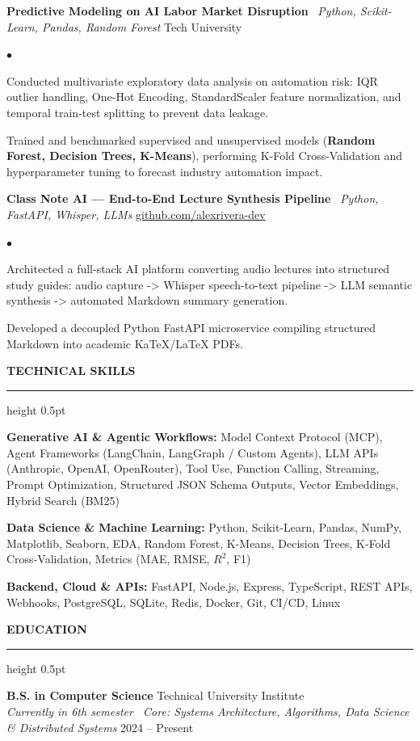\documentclass[10pt,letterpaper]{article}
\newcommand{\resumesection}[1]{%
  \vspace{2pt}%
  {\color{primary}\normalsize\bfseries\MakeUppercase{#1}}%
  \vspace{1pt}\hrule height 0.5pt\vspace{2pt}%
}
\renewenvironment{itemize}{%
  \begin{list}{\color{primary}$\bullet$}{%
    \setlength{\leftmargin}{1.1em}%
    \setlength{\itemsep}{0.5pt}%
    \setlength{\topsep}{1pt}%
    \setlength{\parsep}{0pt}%
    \setlength{\partopsep}{0pt}%
  }%
}{%
  \end{list}%
}
\newenvironment{skilllist}{%
  \begin{list}{}{%
    \setlength{\leftmargin}{0pt}%
    \setlength{\itemsep}{0.5pt}%
    \setlength{\topsep}{1pt}%
    \setlength{\parsep}{0pt}%
    \setlength{\partopsep}{0pt}%
  }%
}{%
  \end{list}%
}
\begin{document}
\vspace{1pt}

\textbf{Predictive Modeling on AI Labor Market Disruption} \textbar\ \textit{Python, Scikit-Learn, Pandas, Random Forest} \hfill Tech University
\begin{itemize}
    \item Conducted multivariate exploratory data analysis on automation risk: IQR outlier handling, One-Hot Encoding, StandardScaler feature normalization, and temporal train-test splitting to prevent data leakage.
    \item Trained and benchmarked supervised and unsupervised models (\textbf{Random Forest, Decision Trees, K-Means}), performing K-Fold Cross-Validation and hyperparameter tuning to forecast industry automation impact.
\end{itemize}

\vspace{1pt}

\textbf{Class Note AI — End-to-End Lecture Synthesis Pipeline} \textbar\ \textit{Python, FastAPI, Whisper, LLMs} \hfill \href{https://github.com/alexrivera-dev}{github.com/alexrivera-dev}
\begin{itemize}
    \item Architected a full-stack AI platform converting audio lectures into structured study guides: audio capture -> Whisper speech-to-text pipeline -> LLM semantic synthesis -> automated Markdown summary generation.
    \item Developed a decoupled Python FastAPI microservice compiling structured Markdown into academic KaTeX/LaTeX PDFs.
\end{itemize}

\resumesection{Technical Skills}
\begin{skilllist}
    \item \textbf{Generative AI \& Agentic Workflows:} Model Context Protocol (MCP), Agent Frameworks (LangChain, LangGraph / Custom Agents), LLM APIs (Anthropic, OpenAI, OpenRouter), Tool Use, Function Calling, Streaming, Prompt Optimization, Structured JSON Schema Outputs, Vector Embeddings, Hybrid Search (BM25)
    \item \textbf{Data Science \& Machine Learning:} Python, Scikit-Learn, Pandas, NumPy, Matplotlib, Seaborn, EDA, Random Forest, K-Means, Decision Trees, K-Fold Cross-Validation, Metrics (MAE, RMSE, $R^2$, F1)
    \item \textbf{Backend, Cloud \& APIs:} FastAPI, Node.js, Express, TypeScript, REST APIs, Webhooks, PostgreSQL, SQLite, Redis, Docker, Git, CI/CD, Linux
\end{skilllist}

\resumesection{Education}
\textbf{B.S. in Computer Science} \hfill Technical University Institute \\
\textit{Currently in 6th semester \textbar\ Core: Systems Architecture, Algorithms, Data Science \& Distributed Systems} \hfill 2024 -- Present
\end{document}
